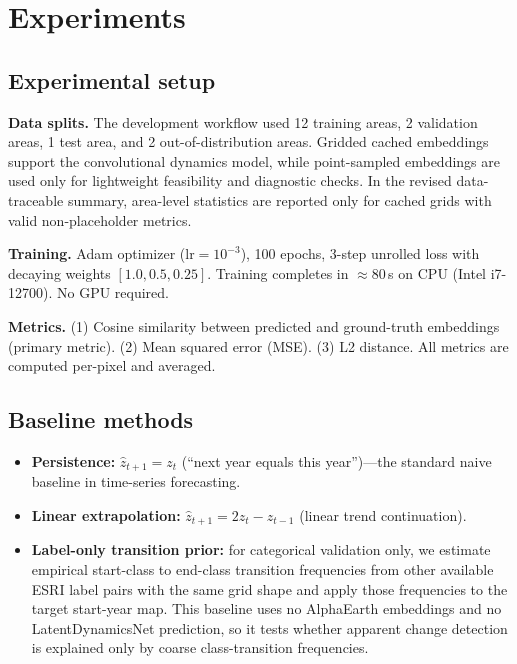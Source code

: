 \documentclass{article}
\begin{document}
\section{Experiments}
\label{sec:experiments}

\subsection{Experimental setup}

\textbf{Data splits.} The development workflow used 12 training areas, 2 validation areas, 1 test area, and 2 out-of-distribution areas. Gridded cached embeddings support the convolutional dynamics model, while point-sampled embeddings are used only for lightweight feasibility and diagnostic checks. In the revised data-traceable summary, area-level statistics are reported only for cached grids with valid non-placeholder metrics.

\textbf{Training.} Adam optimizer ($\text{lr} = 10^{-3}$), 100 epochs, 3-step unrolled loss with decaying weights $[1.0, 0.5, 0.25]$. Training completes in $\approx$80\,s on CPU (Intel i7-12700). No GPU required.

\textbf{Metrics.} (1) Cosine similarity between predicted and ground-truth embeddings (primary metric). (2) Mean squared error (MSE). (3) L2 distance. All metrics are computed per-pixel and averaged.

\subsection{Baseline methods}

\begin{itemize}
\item \textbf{Persistence:} $\hat{z}_{t+1} = z_t$ (``next year equals this year'')---the standard naive baseline in time-series forecasting.
\item \textbf{Linear extrapolation:} $\hat{z}_{t+1} = 2z_t - z_{t-1}$ (linear trend continuation).
\item \textbf{Label-only transition prior:} for categorical validation only, we estimate empirical start-class to end-class transition frequencies from other available ESRI label pairs with the same grid shape and apply those frequencies to the target start-year map. This baseline uses no AlphaEarth embeddings and no LatentDynamicsNet prediction, so it tests whether apparent change detection is explained only by coarse class-transition frequencies.
\end{itemize}
\end{document}
